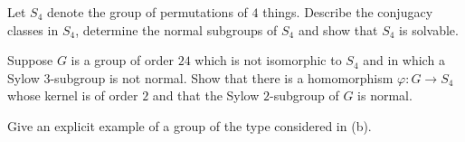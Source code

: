 \begin{alist}
\item Let $S_4$ denote the group of permutations of $4$
things. Describe the conjugacy classes in $S_4$, determine the normal
subgroups of $S_4$ and show that $S_4$ is solvable.
\item Suppose $G$ is a group of order $24$ which is not isomorphic to
$S_4$ and in which a Sylow $3$-subgroup is not normal. Show that
there is a homomorphism $\varphi:G\rightarrow S_4$ whose kernel is of
order $2$ and that the Sylow $2$-subgroup of $G$ is normal.
\item Give an explicit example of a group of the type considered in
(b).
\end{alist}

